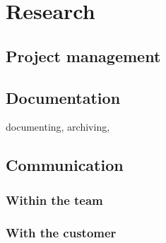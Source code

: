 \chapter{Research}
\section{Project management}

\section{Documentation}
documenting, archiving,


\section{Communication}
\subsection{Within the team}
\subsection{With the customer}
